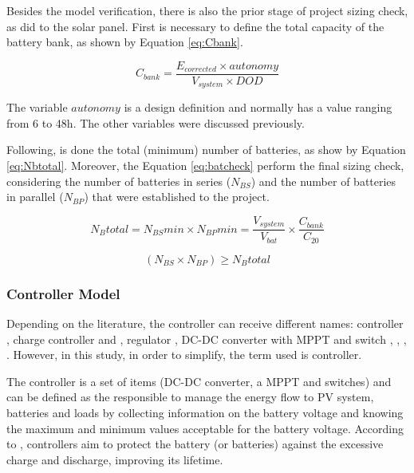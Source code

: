 Besides the model verification, there is also the prior stage of project sizing check, as did to the solar panel. First is necessary to define the total capacity of the battery bank, as shown by Equation \ref{eq:Cbank}.

\begin{equation}
\label{eq:Cbank}
C_{bank} = \dfrac{E_{corrected} \times autonomy}{V_{system} \times DOD}
\end{equation}

The variable $ autonomy $ is a design definition and normally has a value ranging from 6 to 48h. The other variables were discussed previously.

Following, is done the total (minimum) number of batteries, as show by Equation \ref{eq:Nbtotal}. Moreover, the Equation \ref{eq:batcheck} perform the final sizing check, considering the number of batteries in series ($ N_{BS} $) and the number of batteries in parallel ($ N_{BP} $) that were established to the project.

\begin{equation}
\label{eq:Nbtotal}
N_{B}total = N_{BS}min \times N_{BP}min = \dfrac{V_{system}}{V_{bat}} \times \dfrac{C_{bank}}{C_{20}}
\end{equation}

\begin{equation}
\label{eq:batcheck}
\left( N_{BS} \times  N_{BP} \right) \geq N_{B}total
\end{equation}

\subsubsection{Controller Model}
Depending on the literature, the controller can receive different names: controller \cite{Hansen}, charge controller \cite{Mahanta} and \cite{Chauhan}, regulator \cite{Mellit}, DC-DC converter with MPPT and switch \cite{Dhanowa}, \cite{Yatimi}, \cite{Abdulateef}, \cite{Roy}. However, in this study, in order to simplify, the term used is controller. 

The controller is a set of items (DC-DC converter, a MPPT and switches) and can be defined as the responsible to manage the energy flow to PV system, batteries and loads by collecting information on the battery voltage and knowing the maximum and minimum values acceptable for the battery voltage. According to \cite{Pinho}, controllers aim to protect the battery (or batteries) against the excessive charge and discharge, improving its lifetime. 

